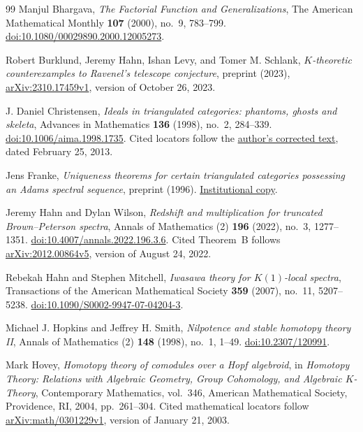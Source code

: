 \begin{thebibliography}{99}
Manjul Bhargava,
\emph{The Factorial Function and Generalizations},
The American Mathematical Monthly \textbf{107} (2000), no.~9, 783--799.
\href{https://doi.org/10.1080/00029890.2000.12005273}{doi:10.1080/00029890.2000.12005273}.

Robert Burklund, Jeremy Hahn, Ishan Levy, and Tomer M. Schlank,
\emph{$K$-theoretic counterexamples to Ravenel's telescope conjecture},
preprint (2023),
\href{https://arxiv.org/abs/2310.17459v1}{arXiv:2310.17459v1},
version of October 26, 2023.

J. Daniel Christensen,
\emph{Ideals in triangulated categories: phantoms, ghosts and skeleta},
Advances in Mathematics \textbf{136} (1998), no.~2, 284--339.
\href{https://doi.org/10.1006/aima.1998.1735}{doi:10.1006/aima.1998.1735}.
Cited locators follow the
\href{https://jdc.math.uwo.ca/papers/ideals.pdf}{author's corrected text},
dated February 25, 2013.

Jens Franke,
\emph{Uniqueness theorems for certain triangulated categories possessing
an Adams spectral sequence},
preprint (1996).
\href{https://webusers.imj-prg.fr/~georges.maltsiniotis/groth/ps/Adams.pdf}{Institutional copy}.

Jeremy Hahn and Dylan Wilson,
\emph{Redshift and multiplication for truncated Brown--Peterson spectra},
Annals of Mathematics (2) \textbf{196} (2022), no.~3, 1277--1351.
\href{https://doi.org/10.4007/annals.2022.196.3.6}{doi:10.4007/annals.2022.196.3.6}.
Cited Theorem~B follows
\href{https://arxiv.org/abs/2012.00864v5}{arXiv:2012.00864v5},
version of August 24, 2022.

Rebekah Hahn and Stephen Mitchell,
\emph{Iwasawa theory for $K(1)$-local spectra},
Transactions of the American Mathematical Society \textbf{359} (2007),
no.~11, 5207--5238.
\href{https://doi.org/10.1090/S0002-9947-07-04204-3}{doi:10.1090/S0002-9947-07-04204-3}.

Michael J. Hopkins and Jeffrey H. Smith,
\emph{Nilpotence and stable homotopy theory II},
Annals of Mathematics (2) \textbf{148} (1998), no.~1, 1--49.
\href{https://doi.org/10.2307/120991}{doi:10.2307/120991}.

Mark Hovey,
\emph{Homotopy theory of comodules over a Hopf algebroid},
in \emph{Homotopy Theory: Relations with Algebraic Geometry,
Group Cohomology, and Algebraic $K$-Theory},
Contemporary Mathematics, vol.~346,
American Mathematical Society, Providence, RI, 2004, pp.~261--304.
Cited mathematical locators follow
\href{https://arxiv.org/abs/math/0301229v1}{arXiv:math/0301229v1},
version of January 21, 2003.


\end{thebibliography}
